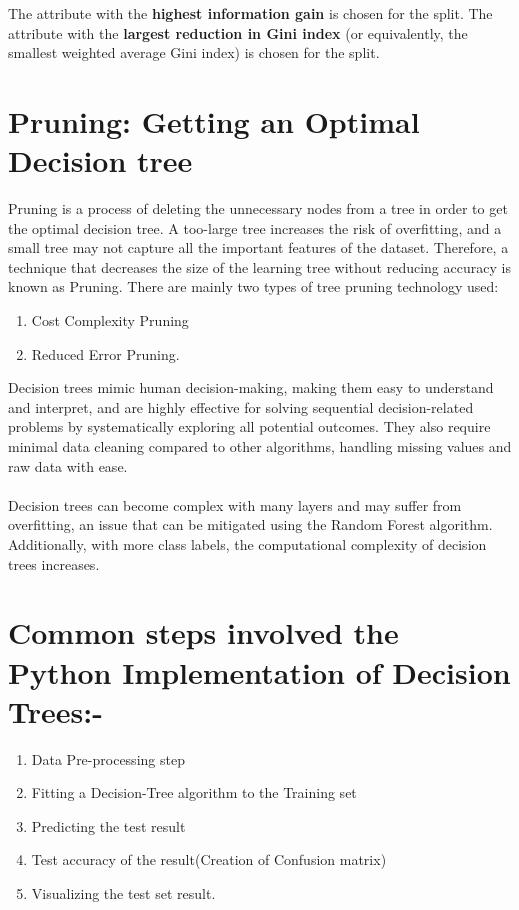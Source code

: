 \documentclass[12pt,a4paper]{report}
\begin{document}
The attribute with the \textbf{highest information gain} is chosen for the split. The attribute with the \textbf{largest reduction in Gini index} (or equivalently, the smallest weighted average Gini index) is chosen for the split.

\section*{Pruning: Getting an Optimal Decision tree}
Pruning is a process of deleting the unnecessary nodes from a tree in order to get the optimal decision tree.
A too-large tree increases the risk of overfitting, and a small tree may not capture all the important features of the dataset. Therefore, a technique that decreases the size of the learning tree without reducing accuracy is known as Pruning. There are mainly two types of tree pruning technology used:
\begin{enumerate}
    \item Cost Complexity Pruning
    \item Reduced Error Pruning.
\end{enumerate}

Decision trees mimic human decision-making, making them easy to understand and interpret, and are highly effective for solving sequential decision-related problems by systematically exploring all potential outcomes. They also require minimal data cleaning compared to other algorithms, handling missing values and raw data with ease.\\
\\
Decision trees can become complex with many layers and may suffer from overfitting, an issue that can be mitigated using the Random Forest algorithm. Additionally, with more class labels, the computational complexity of decision trees increases.

\section*{Common steps involved the Python Implementation of Decision Trees:-}
\begin{enumerate}
    \item Data Pre-processing step
    \item Fitting a Decision-Tree algorithm to the Training set
    \item Predicting the test result
    \item Test accuracy of the result(Creation of Confusion matrix)
    \item Visualizing the test set result.
\end{enumerate}
\end{document}
